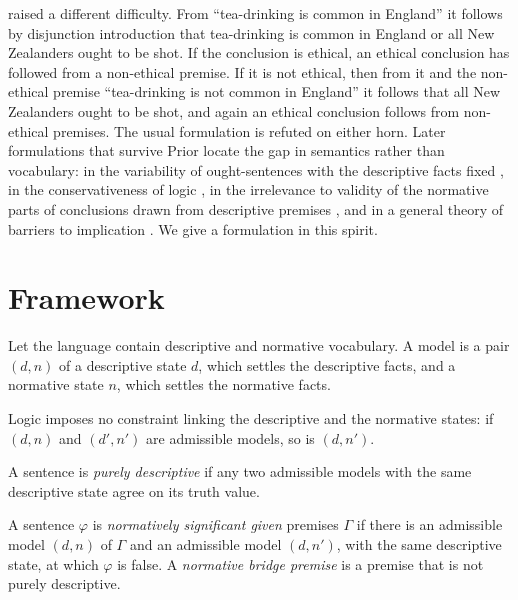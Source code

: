 \documentclass{situationist-preprint}
\begin{document}
\citet{Prior1960} raised a different difficulty. From \enquote{tea-drinking is common in England} it follows by disjunction introduction that tea-drinking is common in England or all New Zealanders ought to be shot. If the conclusion is ethical, an ethical conclusion has followed from a non-ethical premise. If it is not ethical, then from it and the non-ethical premise \enquote{tea-drinking is not common in England} it follows that all New Zealanders ought to be shot, and again an ethical conclusion follows from non-ethical premises. The usual formulation is refuted on either horn. Later formulations that survive Prior locate the gap in semantics rather than vocabulary: in the variability of ought-sentences with the descriptive facts fixed \citep{Karmo1988}, in the conservativeness of logic \citep{Pigden1989}, in the irrelevance to validity of the normative parts of conclusions drawn from descriptive premises \citep{Schurz1997}, and in a general theory of barriers to implication \citep{RussellRestall2010}. We give a formulation in this spirit.

\section{Framework}

Let the language contain descriptive and normative vocabulary. A model is a pair $(d,n)$ of a descriptive state $d$, which settles the descriptive facts, and a normative state $n$, which settles the normative facts.

\begin{assumption}\label{a:auton}
Logic imposes no constraint linking the descriptive and the normative states: if $(d,n)$ and $(d',n')$ are admissible models, so is $(d,n')$.
\end{assumption}

\begin{definition}\label{d:desc}
A sentence is \emph{purely descriptive} if any two admissible models with the same descriptive state agree on its truth value.
\end{definition}

\begin{definition}\label{d:sig}
A sentence $\varphi$ is \emph{normatively significant given} premises $\Gamma$ if there is an admissible model $(d,n)$ of $\Gamma$ and an admissible model $(d,n')$, with the same descriptive state, at which $\varphi$ is false. A \emph{normative bridge premise} is a premise that is not purely descriptive.
\end{definition}
\end{document}
